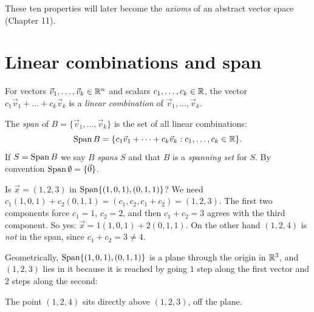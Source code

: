 These ten properties will later become the \emph{axioms} of an abstract vector space
(Chapter 11).

\section{Linear combinations and span}

\begin{definition}
For vectors $\vec v_1,\dots,\vec v_k\in\mathbb{R}^n$ and scalars $c_1,\dots,c_k\in\mathbb{R}$, the vector
$c_1\vec v_1+\dots+c_k\vec v_k$ is a \emph{linear combination} of $\vec v_1,\dots,\vec v_k$.
\end{definition}

\begin{definition}[Span]
The \emph{span} of $B=\{\vec v_1,\dots,\vec v_k\}$ is the set of all linear combinations:
\[
  \operatorname{Span} B = \{c_1\vec v_1+\dots+c_k\vec v_k : c_1,\dots,c_k\in\mathbb{R}\}.
\]
If $S=\operatorname{Span} B$ we say $B$ \emph{spans} $S$ and that $B$ is a \emph{spanning set} for $S$.
By convention $\operatorname{Span}\emptyset = \{\vec 0\}$.
\end{definition}

\begin{example}
Is $\vec x = (1,2,3)$ in $\operatorname{Span}\{(1,0,1),(0,1,1)\}$? We need
$c_1(1,0,1)+c_2(0,1,1) = (c_1, c_2, c_1+c_2) = (1,2,3)$. The first two components force
$c_1=1$, $c_2=2$, and then $c_1+c_2=3$ agrees with the third component. So yes:
$\vec x = 1(1,0,1)+2(0,1,1)$. On the other hand $(1,2,4)$ is \emph{not} in the span, since
$c_1+c_2=3\ne 4$.
\end{example}

Geometrically, $\operatorname{Span}\{(1,0,1),(0,1,1)\}$ is a plane through the origin in $\mathbb{R}^3$, and
$(1,2,3)$ lies in it because it is reached by going $1$ step along the first vector and $2$
steps along the second:
\begin{center}
\end{center}
The point $(1,2,4)$ sits directly above $(1,2,3)$, off the plane.

